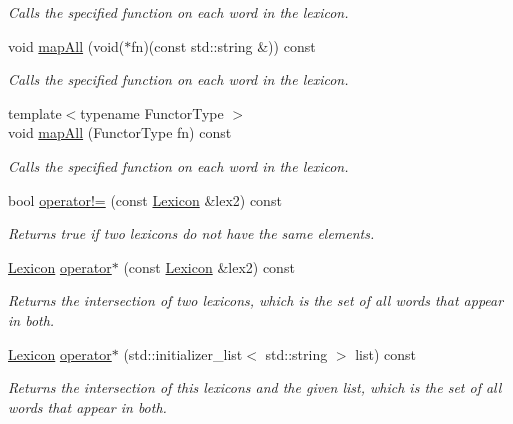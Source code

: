 \begin{DoxyCompactItemize}
\begin{DoxyCompactList}\small\item\em Calls the specified function on each word in the lexicon. \end{DoxyCompactList}\item 
void \mbox{\hyperlink{classLexicon_abab83598d63d43b15cf018fa020e1ddf}{map\+All}} (void($\ast$fn)(const std\+::string \&)) const
\begin{DoxyCompactList}\small\item\em Calls the specified function on each word in the lexicon. \end{DoxyCompactList}\item 
{\footnotesize template$<$typename Functor\+Type $>$ }\\void \mbox{\hyperlink{classLexicon_a8dc32c1e45704cfae41daf8adb4e66dc}{map\+All}} (Functor\+Type fn) const
\begin{DoxyCompactList}\small\item\em Calls the specified function on each word in the lexicon. \end{DoxyCompactList}\item 
bool \mbox{\hyperlink{classLexicon_af42d8a30a8c4b2d33a6be3b12258e152}{operator!=}} (const \mbox{\hyperlink{classLexicon}{Lexicon}} \&lex2) const
\begin{DoxyCompactList}\small\item\em Returns true if two lexicons do not have the same elements. \end{DoxyCompactList}\item 
\mbox{\hyperlink{classLexicon}{Lexicon}} \mbox{\hyperlink{classLexicon_a62286f0f5d7c1229b3003b855bf54ba3}{operator$\ast$}} (const \mbox{\hyperlink{classLexicon}{Lexicon}} \&lex2) const
\begin{DoxyCompactList}\small\item\em Returns the intersection of two lexicons, which is the set of all words that appear in both. \end{DoxyCompactList}\item 
\mbox{\hyperlink{classLexicon}{Lexicon}} \mbox{\hyperlink{classLexicon_a5da3a8f0f6332bccefe7b2cb48d8a8d6}{operator$\ast$}} (std\+::initializer\+\_\+list$<$ std\+::string $>$ list) const
\begin{DoxyCompactList}\small\item\em Returns the intersection of this lexicons and the given list, which is the set of all words that appear in both. \end{DoxyCompactList}\item 

\end{DoxyCompactItemize}
